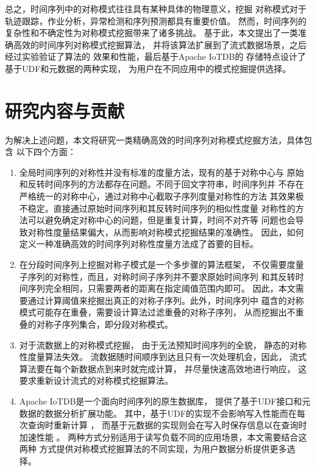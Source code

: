 总之，时间序列中的对称模式往往具有某种具体的物理意义，挖掘
对称模式对于轨迹跟踪，作业分析，异常检测和序列预测都具有重要价值。
然而，时间序列的复杂性和不确定性为对称模式挖掘带来了诸多挑战。
基于此，本文提出了一类准确高效的时间序列对称模式挖掘算法，
并将该算法扩展到了流式数据场景，之后经过实验验证了算法的
效果和性能，最后基于Apache IoTDB\cite{10.14778/3415478.3415504}的
存储特点设计了基于UDF和元数据的两种实现，
为用户在不同应用中的模式挖掘提供选择。


\section{研究内容与贡献}
为解决上述问题，本文将研究一类精确高效的时间序列对称模式挖掘方法，具体包含
以下四个方面：
\begin{enumerate}
  \item 全局时间序列的对称性并没有标准的度量方法，现有的基于对称中心与
  原始和反转时间序列的方法都存在问题。不同于回文字符串，时间序列并
  不存在严格统一的对称中心，通过对称中心截取子序列度量对称性的方法
  其效果极不稳定。直接通过原始时间序列和其反转时间序列的相似性度量
  对称性的方法可以避免确定对称中心的问题，但是重复计算，时间不对齐等
  问题也会导致对称性度量结果偏大，从而影响对称模式挖掘结果的准确性。
  因此，如何定义一种准确高效的时间序列对称性度量方法成了首要的目标。
  \item 在分段时间序列上挖掘对称子模式是一个多步骤的算法框架，
  不仅需要度量子序列的对称性，而且，对称时间子序列并不要求原始时间序列
  和其反转时间序列完全相同，只需要两者的距离在指定阈值范围内即可。
  因此，本文需要通过计算阈值来挖掘出真正的对称子序列。此外，时间序列中
  蕴含的对称模式可能存在重叠，需要设计算法过滤重叠的对称子序列，
  从而挖掘出不重叠的对称子序列集合，即分段对称模式。
  \item 对于流数据上的对称模式挖掘，
  由于无法预知时间序列的全貌，
  静态的对称性度量算法失效。
  流数据随时间顺序到达且只有一次处理机会，因此，
  流式算法要在每个新数据点到来时就完成计算，
  并尽量快速高效地进行响应，
  这要求重新设计流式的对称模式挖掘算法。
  \item Apache IoTDB是一个面向时间序列的原生数据库，
  提供了基于UDF接口和元数据的数据分析扩展功能。
  其中，基于UDF的实现不会影响写入性能而在每次查询时重新计算
  \cite{DBLP:journals/jiis/Castro-LopezBL20}，
  而基于元数据的实现则会在写入时保存信息以在查询时加速性能
  \cite{DBLP:phd/hal/Zhang19c}。
  两种方式分别适用于读写负载不同的应用场景，本文需要结合这两种
  方式提供对称模式挖掘算法的不同实现，为用户数据分析提供更多选择。
  
\end{enumerate}

